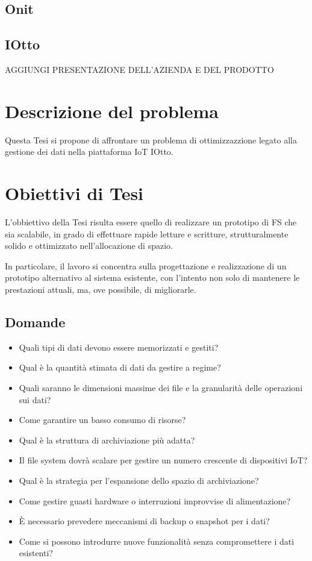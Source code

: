 \documentclass[12pt,a4paper,openright,twoside]{book}
\begin{document}
        \subsection{Onit}
        \subsection{IOtto}

        AGGIUNGI PRESENTAZIONE DELL'AZIENDA E DEL PRODOTTO

    \section{Descrizione del problema}

        Questa Tesi si propone di affrontare un problema di ottimizzazzione legato alla gestione dei dati nella piattaforma \ac{IoT} IOtto.

    \section{Obiettivi di Tesi}

        L'obbiettivo della Tesi risulta essere quello di realizzare un prototipo di \ac{FS} che sia scalabile, in grado di effettuare rapide letture e scritture, strutturalmente solido e ottimizzato nell'allocazione di spazio.

        In particolare, il lavoro si concentra sulla progettazione e realizzazione di un prototipo alternativo al sistema esistente, con l'intento non solo di mantenere le prestazioni attuali, ma, ove possibile, di migliorarle.

        \subsection{Domande}

            \begin{itemize}
                \item Quali tipi di dati devono essere memorizzati e gestiti?
                \item Qual è la quantità stimata di dati da gestire a regime?
                \item Quali saranno le dimensioni massime dei file e la granularità delle operazioni sui dati?
                \item Come garantire un basso consumo di risorse?
                \item Qual è la struttura di archiviazione più adatta?
                \item Il file system dovrà scalare per gestire un numero crescente di dispositivi IoT?
                \item Qual è la strategia per l'espansione dello spazio di archiviazione?
                \item Come gestire guasti hardware o interruzioni improvvise di alimentazione?
                \item È necessario prevedere meccanismi di backup o snapshot per i dati?
                \item Come si possono introdurre nuove funzionalità senza compromettere i dati esistenti?
            \end{itemize}
\end{document}
